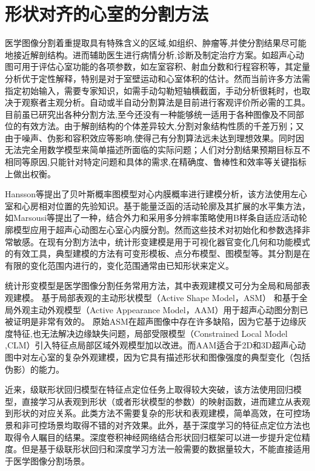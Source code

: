 \chapter{形状对齐的心室的分割方法}
\label{chap:Segmentation}
 
医学图像分割着重提取具有特殊含义的区域,如组织、肿瘤等,并使分割结果尽可能地接近解剖结构。进而辅助医生进行病情分析,诊断及制定治疗方案。如超声心动图可用于评估心室功能的各项参数，如左室容积、射血分数和行程容积等，其定量分析优于定性解释，特别是对于室壁运动和心室体积的估计。然而当前许多方法需指定初始输入，需要专家知识，如需手动勾勒短轴横截面，手动分析很耗时，也取决于观察者主观分析。自动或半自动分割算法是目前进行客观评价所必需的工具。目前虽已研究出各种分割方法,至今还没有一种能够统一适用于各种图像及不同部位的有效方法。由于解剖结构的个体差异较大,分割对象结构性质的千差万别；又由于噪声、伪影和容积效应等影响,使得己有分割算法远未达到理想效果。同时因无法完全用数学模型来简单描述所面临的实际问题；人们对分割结果预期目标互不相同等原因,只能针对特定问题和具体的需求,在精确度、鲁棒性和效率等关键指标上做出权衡\citep{Bosch2002}。

Hansson等\citep{Hansson2014}提出了贝叶斯概率图模型对心内膜概率进行建模分析，该方法使用左心室和心房相对位置的先验知识。基于能量泛函的活动轮廓及其扩展的水平集方法，如Marsousi等\citep{Marsousi2010}提出了一种，结合外力和采用多分辨率策略使用B样条自适应活动轮廓模型应用于超声心动图左心室心内膜分割。然而这些技术对初始化和参数选择非常敏感。在现有分割方法中，统计形变建模是用于可视化器官变化几何和功能模式的有效工具\citep{Santiago2016}，典型建模的方法有可变形模板、点分布模型、图模型等。其分割是在有限的变化范围内进行的，变化范围通常由已知形状来定义。

统计形变模型是医学图像分割任务常用方法，其中表观建模又可分为全局和局部表观建模。
基于局部表观的主动形状模型（Active Shape Model，ASM）\citep{Cootes1995a} 和基于全局外观主动外观模型（Active Appearance Model，AAM）\citep{Cootes2001}用于超声心动图分割已被证明是非常有效的\citep{Bosch2002,Mitchell2002,Vargas-Quintero2016}。
原始ASM在超声图像中存在许多缺陷\citep{Santiago2016}，因为它基于边缘灰度特征,也无法解决边缘缺失问题，局部受限模型\citep{Cristinacce2008a}（Constrained Local Model ,CLM）引入特征点局部区域外观模型加以改进。而AAM适合于2D和3D超声心动图中对左心室的复杂外观建模，因为它具有描述形状和图像强度的典型变化（包括伪影）的能力\citep{VanStralen2015}。

近来，级联形状回归模型\citep{Kazemi2014a}在特征点定位任务上取得较大突破，该方法使用回归模型，直接学习从表观到形状（或者形状模型的参数）的映射函数，进而建立从表观到形状的对应关系。此类方法不需要复杂的形状和表观建模，简单高效，在可控场景和非可控场景均取得不错的对齐效果。此外，基于深度学习的特征点定位方法\citep{Trigeorgis2016}也取得令人瞩目的结果。深度卷积神经网络结合形状回归框架可以进一步提升定位精度。但是基于级联形状回归和深度学习方法一般需要的数据量较大，不能直接适用于医学图像分割场景。

